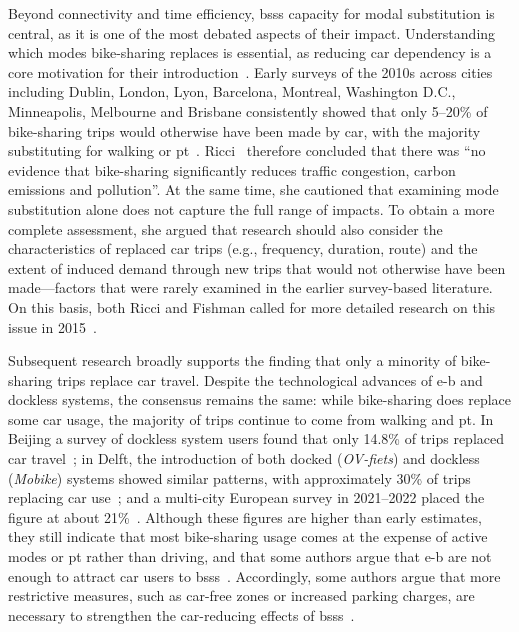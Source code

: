 Beyond connectivity and time efficiency, \acp{bss} capacity for modal substitution is central, as it is one of the most debated aspects of their impact. Understanding which modes bike-sharing replaces is essential, as reducing car dependency is a core motivation for their introduction~\cite{Fishman2016}. Early surveys of the 2010s across cities including Dublin, London, Lyon, Barcelona, Montreal, Washington D.C., Minneapolis, Melbourne and Brisbane consistently showed that only 5--20\% of bike-sharing trips would otherwise have been made by car, with the majority substituting for walking or \ac{pt}~\cite{Murphy2015, Fishman2013, Fishman2014, BachandMarleau2012}. Ricci~\cite{Ricci2015} therefore concluded that there was “no evidence that bike-sharing significantly reduces traffic congestion, carbon emissions and pollution”. At the same time, she cautioned that examining mode substitution alone does not capture the full range of impacts. To obtain a more complete assessment, she argued that research should also consider the characteristics of replaced car trips (e.g., frequency, duration, route) and the extent of induced demand through new trips that would not otherwise have been made—factors that were rarely examined in the earlier survey-based literature. On this basis, both Ricci and Fishman called for more detailed research on this issue in 2015~\cite{Ricci2015, Fishman2016}.  

Subsequent research broadly supports the finding that only a minority of bike-sharing trips replace car travel. Despite the technological advances of \ac{e-b} and dockless systems, the consensus remains the same: while bike-sharing does replace some car usage, the majority of trips continue to come from walking and \ac{pt}. In Beijing a survey of dockless system users found that only 14.8\% of trips replaced car travel~\cite{Chen2022b}; in Delft, the introduction of both docked (\textit{OV-fiets}) and dockless (\textit{Mobike}) systems showed similar patterns, with approximately 30\% of trips replacing car use~\cite{Ma2020}; and a multi-city European survey in 2021--2022 placed the figure at about 21\%~\cite{Bosehans2024}. Although these figures are higher than early estimates, they still indicate that most bike-sharing usage comes at the expense of active modes or \ac{pt} rather than driving, and that some authors argue that \ac{e-b} are not enough to attract car users to \acp{bss}~\cite{Teixeira2023}. Accordingly, some authors argue that more restrictive measures, such as car-free zones or increased parking charges, are necessary to strengthen the car-reducing effects of \acp{bss}~\cite{Bosehans2024}.

